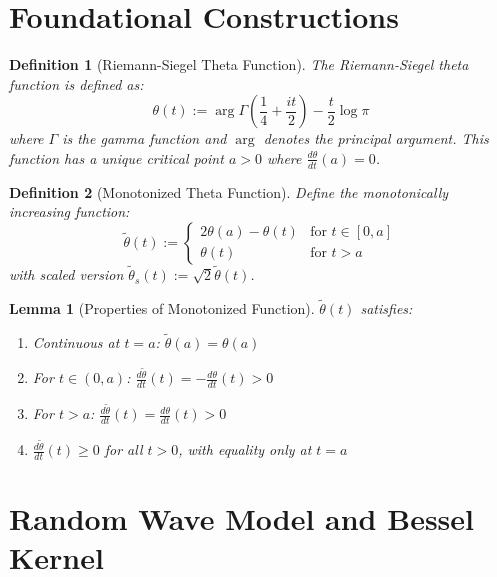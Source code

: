 \documentclass{article}
\newcommand{\assign}{:=}
\newtheorem{definition}{Definition}
\newtheorem{lemma}{Lemma}
\begin{document}
\section{Foundational Constructions}

\begin{definition}
  [Riemann-Siegel Theta Function] The Riemann-Siegel theta function is defined
  as:
  \begin{equation}
    \theta (t) \assign \arg \Gamma \left( \frac{1}{4} + \frac{it}{2} \right) -
    \frac{t}{2} \log \pi
  \end{equation}
  where $\Gamma$ is the gamma function and $\arg$ denotes the principal
  argument. This function has a unique critical point $a > 0$ where $\frac{d
  \theta}{dt} (a) = 0$.
\end{definition}

\begin{definition}
  [Monotonized Theta Function] Define the monotonically increasing function:
  \begin{equation}
    \tilde{\theta} (t) \assign \left\{\begin{array}{ll}
      2 \theta (a) - \theta (t) & \text{for } t \in [0, a]\\
      \theta (t) & \text{for } t > a
    \end{array}\right.
  \end{equation}
  with scaled version $\tilde{\theta}_s (t) \assign \sqrt{2}  \tilde{\theta}
  (t)$.
\end{definition}

\begin{lemma}
  [Properties of Monotonized Function] $\tilde{\theta} (t)$ satisfies:
  \begin{enumerate}
    \item Continuous at $t = a$: $\tilde{\theta} (a) = \theta (a)$
    
    \item For $t \in (0, a)$: $\frac{d \tilde{\theta}}{dt} (t) = - \frac{d
    \theta}{dt} (t) > 0$
    
    \item For $t > a$: $\frac{d \tilde{\theta}}{dt} (t) = \frac{d \theta}{dt}
    (t) > 0$
    
    \item $\frac{d \tilde{\theta}}{dt} (t) \geq 0$ for all $t > 0$, with
    equality only at $t = a$
  \end{enumerate}
\end{lemma}

\section{Random Wave Model and Bessel Kernel}
\end{document}

